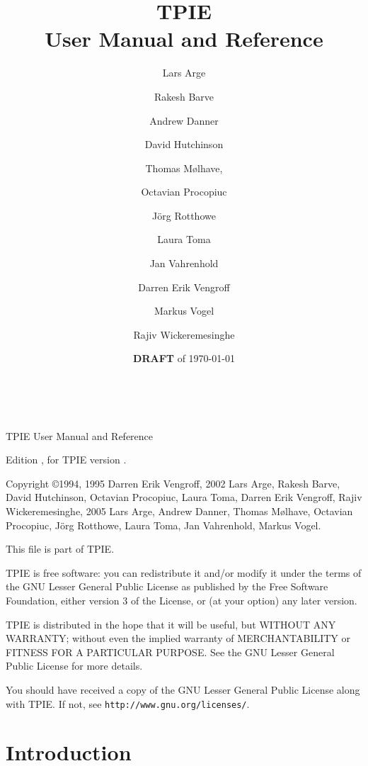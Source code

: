 \documentclass[10pt]{book}
\begin{document}
\title{{\Huge TPIE}\\ User Manual and Reference}
\author{%
Lars Arge \and 
Rakesh Barve \and
Andrew Danner \and
David Hutchinson \and 
Thomas M\o lhave, \and
Octavian Procopiuc \and 
J\"{o}rg Rotthowe \and
Laura Toma \and
Jan Vahrenhold \and
Darren Erik Vengroff \and 
Markus Vogel \and
Rajiv Wickeremesinghe}


\date{{\bf DRAFT} of \today}

\maketitle

\begin{titlepage}
\mbox{ }

\vspace{\fill}

\noindent TPIE User Manual and Reference

\noindent Edition \edition, for TPIE version \version.

\vspace{2ex}

\noindent Copyright \copyright 1994, 1995 Darren Erik Vengroff, 2002 Lars
Arge, Rakesh Barve, David Hutchinson, Octavian Procopiuc, Laura Toma,
Darren Erik Vengroff, Rajiv Wickeremesinghe, 2005 Lars Arge, Andrew
Danner, Thomas M\o lhave, Octavian Procopiuc, J\"{o}rg Rotthowe,
Laura Toma, Jan Vahrenhold, Markus Vogel.


\vspace{2ex}

This file is part of TPIE.

TPIE is free software: you can redistribute it and/or modify
it under the terms of the GNU Lesser General Public License as published by
the Free Software Foundation, either version 3 of the License, or
(at your option) any later version.

TPIE is distributed in the hope that it will be useful,
but WITHOUT ANY WARRANTY; without even the implied warranty of
MERCHANTABILITY or FITNESS FOR A PARTICULAR PURPOSE.  See the
GNU Lesser General Public License for more details.

You should have received a copy of the GNU Lesser General Public License
along with TPIE.  If not, see \texttt{http://www.gnu.org/licenses/}.


\end{titlepage}

\tableofcontents

\chapter*{Introduction}
\end{document}
